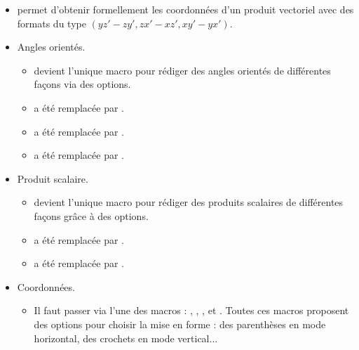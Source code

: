 \documentclass[12pt,a4paper]{book}
\begin{document}
\begin{description}
\begin{itemize}[itemsep=.5em]
\begin{itemize}[itemsep=.5em]
            \item {} permet d'obtenir formellement les coordonnées d'un produit vectoriel avec des formats du type $(y z' - z y' , z x' - x z ' , x y' - y x')$.
    
    
            \item Angles orientés.
            
            \begin{itemize}[itemsep=.5em, label=$\rightarrow$]
                \item {} devient l'unique macro pour rédiger des angles orientés de différentes façons via des options.
                
                \item {}  a été remplacée par .
                
                \item {}  a été remplacée par .
                      
                \item {} a été remplacée par .
    	    \end{itemize}
    
    
            \item Produit scalaire.
            
            \begin{itemize}[itemsep=.5em, label=$\rightarrow$]
                \item {} devient l'unique macro pour rédiger des produits scalaires de différentes façons grâce à des options.
                
                \item {}  a été remplacée par .
    
                \item {} a été remplacée par .
    	    \end{itemize}
    
    
            \item Coordonnées.
            
            \begin{itemize}[itemsep=.5em, label=$\rightarrow$]
                \item Il faut passer via l'une des macros : , , ,  et .
                      Toutes ces macros proposent des options pour choisir la mise en forme : des parenthèses en mode horizontal, des crochets en mode vertical...
    

\end{itemize}
\end{itemize}
\end{itemize}
\end{description}
\end{document}
